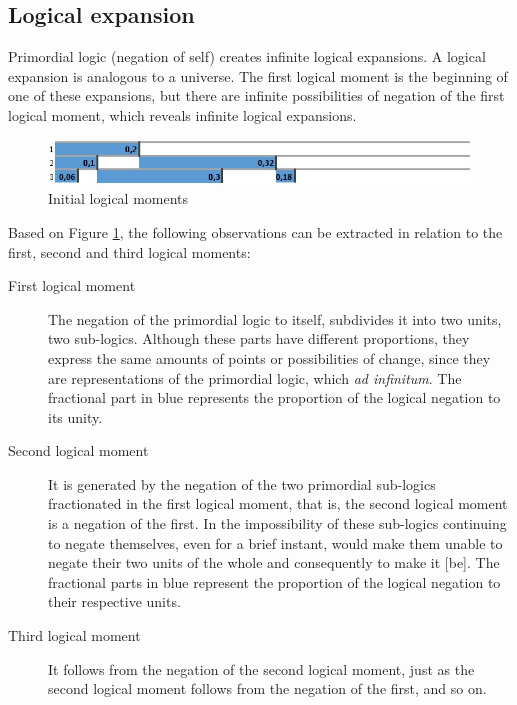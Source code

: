 \subsection{Logical expansion}
Primordial logic (negation of self) creates infinite logical expansions. A logical expansion is analogous to a universe. The first logical moment is the beginning of one of these expansions, but there are infinite possibilities of negation of the first logical moment, which reveals infinite logical expansions.
	\begin{figure}[H]
	\caption{Initial logical moments}
	\label{fig:third_logical_moment}
	\centering
	\includegraphics[scale=.75]{sections/images/third_logical_moment.jpg}
	\end{figure}

Based on Figure \ref{fig:third_logical_moment}, the following observations can be extracted in relation to the first, second and third logical moments:
	\begin{description}
	   \item[First logical moment] The negation of the primordial logic to itself, subdivides it into two units, two sub-logics. Although these parts have different proportions, they express the same amounts of points or possibilities of change, since they are representations of the primordial logic, which \textit{ad infinitum}. The fractional part in blue represents the proportion of the logical negation to its unity.
	   \item[Second logical moment] It is generated by the negation of the two primordial sub-logics fractionated in the first logical moment, that is, the second logical moment is a negation of the first. In the impossibility of these sub-logics continuing to negate themselves, even for a brief instant, would make them unable to negate their two units of the whole and consequently to make it [be]. The fractional parts in blue represent the proportion of the logical negation to their respective units.
	   \item[Third logical moment] It follows from the negation of the second logical moment, just as the second logical moment follows from the negation of the first, and so on.
	\end{description}

